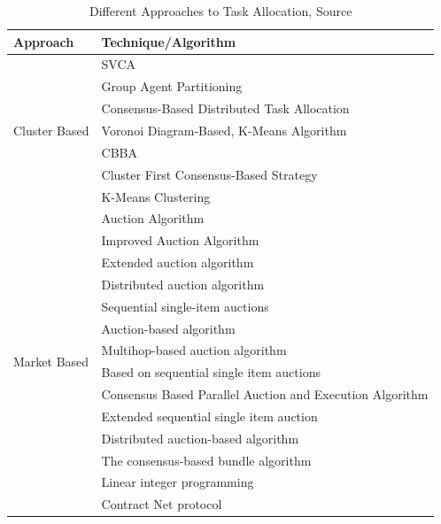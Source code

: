 \begin{table}[bth]
    \centering
    \renewcommand{\arraystretch}{1.2} %
    \begin{tabular}{|l|l|}
        \hline
        \textbf{Approach} & \textbf{Technique/Algorithm} \\ 
        \hline
        \multirow{7}{*}{Cluster Based} & SVCA \cite{MARTIN2023104314} \\ 
        & Group Agent Partitioning \cite{9423979} \\ 
        & Consensus-Based Distributed Task Allocation \cite{8584210} \\ 
        & Voronoi Diagram-Based, K-Means Algorithm \cite{8970316}\\ 
        & CBBA \cite{6787310} \\ 
        & Cluster First Consensus-Based Strategy \\ 
        & K-Means Clustering \\ 
        \hline
        \multirow{16}{*}{Market Based} & Auction Algorithm \cite{10023897} \\
        & Improved Auction Algorithm \cite{9501305} \\
        & Extended auction algorithm \\
        & Distributed auction algorithm \\
        & Sequential single-item auctions \\
        & Auction-based algorithm \\
        & Multihop-based auction algorithm \\
        & Based on sequential single item auctions \\
        & Consensus Based Parallel Auction and Execution Algorithm \\
        & Extended sequential single item auction \\
        & Distributed auction-based algorithm \\
        & The consensus-based bundle algorithm \\
        & Linear integer programming \\
        & Contract Net protocol \\
        \hline
    \end{tabular}
    \caption{Different Approaches to Task Allocation, Source \cite{10.1145/3700591}}
    \label{tab:task-allocation-approaches-1}
\end{table}

